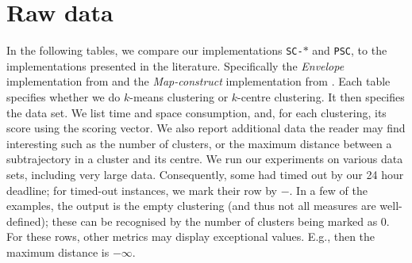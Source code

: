 \section{Raw data}
\label{app:raw}
%
In the following tables, we compare our implementations \texttt{SC-}$\ast$ and \texttt{PSC}, to the implementations presented in the literature. Specifically the \emph{Envelope} implementation from \cite{agarwal2018subtrajectory} and the \emph{Map-construct} implementation from \cite{buchin2020improved}.
%
Each table specifies whether we do $k$-means clustering or $k$-centre clustering.
It then specifies the data set.
We list time and space consumption, and, for each clustering, its score using the scoring vector.
We also report additional data the reader may find interesting such as the number of clusters, or the maximum \frechet distance between a subtrajectory in a cluster and its centre.
%
We run our experiments on various data sets, including very large data. Consequently, some had timed out by our 24 hour deadline; for timed-out instances, we mark their row by $-$. In a few of the examples, the output is the empty clustering (and thus not all measures are well-defined); these can be recognised by the number of clusters being marked as $0$. 
For these rows, other metrics may display exceptional values. E.g., then the maximum \frechet distance is $-\infty$.
%
%
\clearpage
